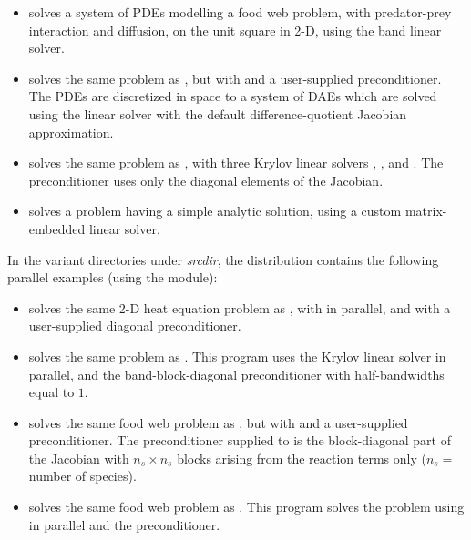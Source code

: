 \begin{itemize}
\item {}
  solves a system of PDEs modelling a food web problem, with predator-prey
  interaction and diffusion, on the unit square in 2-D, using the band
  linear solver.

\item {}
  solves the same problem as , but with {\sunlinsolspgmr}
  and a user-supplied preconditioner.
  The PDEs are discretized in space to a system of DAEs which are solved
  using the {\sunlinsolband} linear solver with the default difference-quotient 
  Jacobian approximation.

\item {}
  solves the same problem as , with three Krylov linear solvers
  {\sunlinsolspgmr}, {\sunlinsolspbcgs}, and {\sunlinsolsptfqmr}.  The
  preconditioner uses only the diagonal elements of the Jacobian.

\item {} solves a problem having a simple analytic
  solution, using a custom matrix-embedded linear solver.


\end{itemize}

\vspace{0.2in}\noindent
In the  variant directories under
{\em srcdir}, the {\ida} distribution contains the
following parallel examples
(using the {\nvecp} module):
\begin{itemize}

\item {}
  solves the same 2-D heat equation problem as , with
  {\sunlinsolspgmr} in parallel, and with a user-supplied diagonal preconditioner.
  
\item {}
  solves the same problem as .
  This program  uses the Krylov linear solver {\sunlinsolspgmr} in parallel, and the
  band-block-diagonal preconditioner {\idabbdpre} with half-bandwidths equal to $1$.

\item {}
  solves the same food web problem as , but with {\sunlinsolspgmr}
  and a user-supplied preconditioner.
  The preconditioner supplied to {\sunlinsolspgmr} is the block-diagonal part of 
  the Jacobian with $n_s \times n_s$ blocks arising from the reaction terms only
  ($n_s =$ number of species).

\item {}
  solves the same food web problem as .
  This program solves the problem using {\sunlinsolspgmr} in parallel and the
  {\idabbdpre} preconditioner.

\end{itemize}

